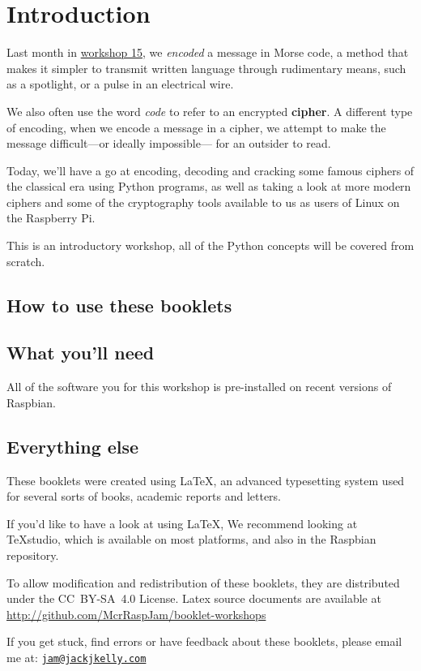 \setcounter{section}{-1}
\section{Introduction}

	Last month in \href{http://mcrraspjam.org.uk/workshop-15-gpio-zero/}{workshop 15}, we \textit{encoded} a message in Morse code, a method that makes it simpler to transmit written language through rudimentary means, such as a spotlight, or a pulse in an electrical wire.
	
	We also often use the word \textit{code} to refer to an encrypted \textbf{cipher}. A different type of encoding, when we encode a message in a cipher, we attempt to make the message difficult---or ideally impossible--- for an outsider to read.
	
	Today, we'll have a go at encoding, decoding and cracking some famous ciphers of the classical era using Python programs, as well as taking a look at more modern ciphers and some of the cryptography tools available to us as users of Linux on the Raspberry Pi.
	
	
	This is an introductory workshop, all of the Python concepts will be covered from scratch.
		
	\subsection*{How to use these booklets}

	
	
	
	
	
	\ifprint\else
		\subsection*{What you'll need}
		All of the software you for this workshop is pre-installed on recent versions of Raspbian.
	\fi
		
	\subsection*{Everything else}
	
		These booklets were created using \textrm{\LaTeX}, an advanced typesetting system used for several sorts of books, academic reports and letters.
			
		\ifprint\else If you'd like to have a look at using LaTeX, We recommend looking at \TeX studio, which is available on most platforms, and also in the Raspbian repository. \fi
		
		To allow modification and redistribution of these booklets, they are distributed under the \hbox{CC BY-SA 4.0} License.
		Latex source documents are available at \url{http://github.com/McrRaspJam/booklet-workshops}
		
		If you get stuck, find errors or have feedback about these booklets, please email me at:
		\href{mailto:jam@jackjkelly.com}{\texttt{jam@jackjkelly.com}}